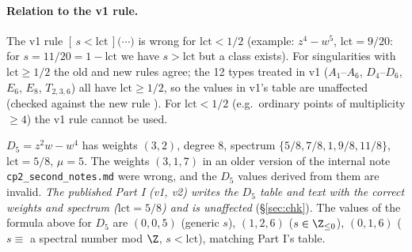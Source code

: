 \paragraph{Relation to the v1 rule.}The v1 rule $[\,s<\mathrm{lct}\,]\bigl(\cdots\bigr)$ is wrong for $\mathrm{lct}<1/2$ (example: $z^4-w^5$, $\mathrm{lct}=9/20$: for $s=11/20=1-\mathrm{lct}$ we have $s>\mathrm{lct}$ but a class exists). For singularities with $\mathrm{lct}\ge1/2$ the old and new rules agree; the 12 types treated in v1 ($A_1$--$A_6$, $D_4$--$D_6$, $E_6$, $E_8$, $T_{2,3,6}$) all have $\mathrm{lct}\ge1/2$, so the values in v1's table are unaffected (checked against the new rule \tV). For $\mathrm{lct}<1/2$ (e.g.\ ordinary points of multiplicity $\ge4$) the v1 rule cannot be used.

\begin{rem}\label{rem:D5}
$D_5=z^2w-w^4$ has weights $(3,2)$, degree $8$, spectrum $\{5/8,7/8,1,9/8,11/8\}$, $\mathrm{lct}=5/8$, $\mu=5$. The weights $(3,1,7)$ in an older version of the internal note \texttt{cp2\_second\_notes.md} were wrong, and the $D_5$ values derived from them are invalid. \emph{The published Part I (v1, v2) writes the $D_5$ table and text with the correct weights and spectrum ($\mathrm{lct}=5/8$) and is unaffected} (\S\ref{sec:chk}). The values of the formula above for $D_5$ are $(0,0,5)$ (generic $s$), $(1,2,6)$ ($s\in\Z_{\le0}$), $(0,1,6)$ ($s\equiv$ a spectral number mod $\Z$, $s<\mathrm{lct}$), matching Part I's table.
\end{rem}

